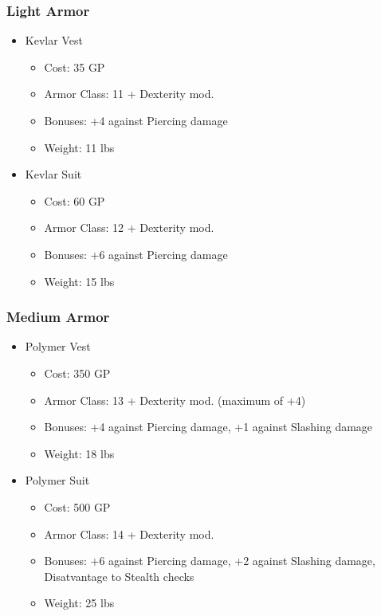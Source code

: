 \documentclass[12pt, landscape]{article}
\begin{document}
\begin{FlushLeft}
\begin{multicols}{2}
			\subsubsection{Light Armor}
			\begin{itemize}[wide]
				\item Kevlar Vest
				\begin{itemize}
					\item Cost: 35 GP
					\item Armor Class: 11 + Dexterity mod.
					\item Bonuses: +4 against Piercing damage
					\item Weight: 11 lbs
				\end{itemize}
				\item Kevlar Suit
				\begin{itemize}
					\item Cost: 60 GP
					\item Armor Class: 12 + Dexterity mod.
					\item Bonuses: +6 against Piercing damage
					\item Weight: 15 lbs
				\end{itemize}
			\end{itemize}

			\subsubsection{Medium Armor}
			\begin{itemize}[wide]
				\item Polymer Vest
				\begin{itemize}
					\item Cost: 350 GP
					\item Armor Class: 13 + Dexterity mod. (maximum of +4)
					\item Bonuses: +4 against Piercing damage, +1 against Slashing damage
					\item Weight: 18 lbs
				\end{itemize}
				\item Polymer Suit
				\begin{itemize}
					\item Cost: 500 GP
					\item Armor Class: 14 + Dexterity mod.
					\item Bonuses: +6 against Piercing damage, +2 against Slashing damage, Disatvantage to Stealth checks
					\item Weight: 25 lbs
				\end{itemize}
			\end{itemize}
			\vfill


\end{multicols}
\end{FlushLeft}
\end{document}
